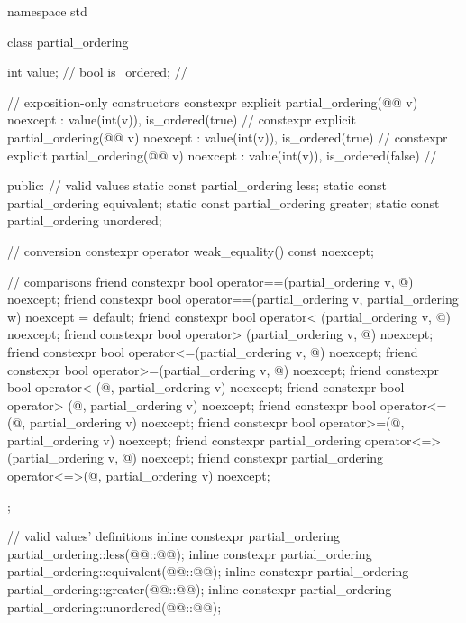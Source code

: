 %
%
%
%
%
\begin{codeblock}
namespace std {
  class partial_ordering {
    int value;          // \expos
    bool is_ordered;    // \expos

    // exposition-only constructors
    constexpr explicit
      partial_ordering(@@ v) noexcept : value(int(v)), is_ordered(true) {}      // \expos
    constexpr explicit
      partial_ordering(@@ v) noexcept : value(int(v)), is_ordered(true) {}     // \expos
    constexpr explicit
      partial_ordering(@@ v) noexcept : value(int(v)), is_ordered(false) {}   // \expos

  public:
    // valid values
    static const partial_ordering less;
    static const partial_ordering equivalent;
    static const partial_ordering greater;
    static const partial_ordering unordered;

    // conversion
    constexpr operator weak_equality() const noexcept;

    // comparisons
    friend constexpr bool operator==(partial_ordering v, @\unspec@) noexcept;
    friend constexpr bool operator==(partial_ordering v, partial_ordering w) noexcept = default;
    friend constexpr bool operator< (partial_ordering v, @\unspec@) noexcept;
    friend constexpr bool operator> (partial_ordering v, @\unspec@) noexcept;
    friend constexpr bool operator<=(partial_ordering v, @\unspec@) noexcept;
    friend constexpr bool operator>=(partial_ordering v, @\unspec@) noexcept;
    friend constexpr bool operator< (@\unspec@, partial_ordering v) noexcept;
    friend constexpr bool operator> (@\unspec@, partial_ordering v) noexcept;
    friend constexpr bool operator<=(@\unspec@, partial_ordering v) noexcept;
    friend constexpr bool operator>=(@\unspec@, partial_ordering v) noexcept;
    friend constexpr partial_ordering operator<=>(partial_ordering v, @\unspec@) noexcept;
    friend constexpr partial_ordering operator<=>(@\unspec@, partial_ordering v) noexcept;
  };

  // valid values' definitions
  inline constexpr partial_ordering partial_ordering::less(@@::@@);
  inline constexpr partial_ordering partial_ordering::equivalent(@@::@@);
  inline constexpr partial_ordering partial_ordering::greater(@@::@@);
  inline constexpr partial_ordering partial_ordering::unordered(@@::@@);
}
\end{codeblock}

